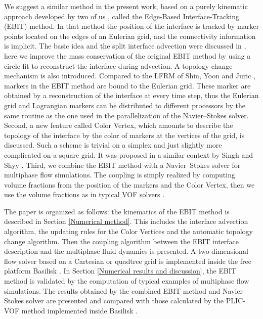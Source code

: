 We suggest a similar method in the present work, based on a purely kinematic approach 
developed by two of us \cite{Chirco_2022_95},
called the Edge-Based Interface-Tracking (EBIT) method.
%
In that method the position of the interface is tracked by marker points
located on the edges of an Eulerian grid, and 
the connectivity information is implicit.
%
The basic idea and the split interface advection were discussed in \cite{Chirco_2022_95},
here we improve the mass conservation of the original EBIT method by using a circle fit to reconstruct the interface during advection.
%
A topology change mechanism is also introduced.
Compared to the LFRM of Shin, Yoon and Juric \cite{Shin_2011_230}, markers in the EBIT method are bound to the
Eulerian grid. These marker are obtained by a reconstruction of
the interface at every time step, thus the Eulerian grid and Lagrangian markers can be distributed to different processors by the same routine
as the one used in the parallelization of the Navier--Stokes solver.
Second, a new feature called Color Vertex,
which amounts to describe the topology of the interface by the color of
markers at the vertices of the grid, is discussed. 
Such a scheme is trivial on a simplex and just slightly more complicated on a square grid. It was
proposed in a similar context by Singh and Shyy \cite{Singh_2007_224}.
Third, we combine the EBIT method with a Navier--Stokes solver for multiphase flow simulations. The coupling is simply
realized by computing volume fractions from the position of the markers and the Color Vertex, then we use the volume fractions as in typical VOF solvers \cite{Tryggvason_2011_book}. 

The paper is organized as follows: the kinematics of the EBIT method is described in Section \ref{Numerical method}.
This includes the interface advection algorithm, the updating rules for the Color Vertices and the automatic topology change algorithm.
Then the coupling algorithm between the EBIT interface description and the multiphase fluid dynamics is presented. 
A two-dimensional flow solver based on a Cartesian or quadtree grid is implemented inside the free platform Basilisk \cite{Popinet_2003_190, Popinet_2009_228}. In Section \ref{Numerical results and discussion}, the EBIT method is validated by the computation of typical examples of
multiphase flow simulations. 
The results obtained by the combined EBIT method and Navier--Stokes solver are presented and compared with those calculated by the PLIC-VOF method implemented inside Basilisk \cite{Popinet_2009_228}.
